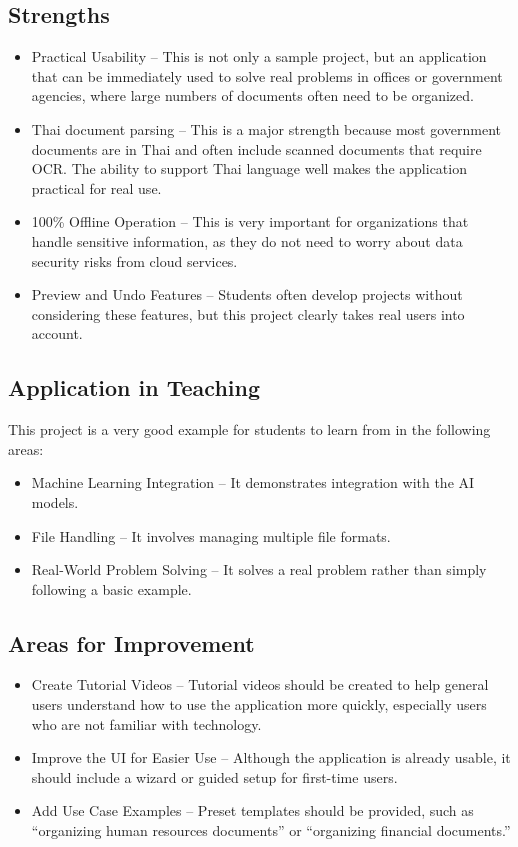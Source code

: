 \documentclass[12pt,oneside,openright,a4paper]{cpe-english-project}
\begin{document}
\subsection*{Strengths}
\begin{itemize}
\item Practical Usability -- This is not only a sample project, but an application that can be immediately used to solve real problems in offices or government agencies, where large numbers of documents often need to be organized.
\item Thai document parsing -- This is a major strength because most government documents are in Thai and often include scanned documents that require OCR. The ability to support Thai language well makes the application practical for real use.
\item 100\% Offline Operation -- This is very important for organizations that handle sensitive information, as they do not need to worry about data security risks from cloud services.
\item Preview and Undo Features -- Students often develop projects without considering these features, but this project clearly takes real users into account.
\end{itemize}
\subsection*{Application in Teaching}
This project is a very good example for students to learn from in the following areas:

\begin{itemize}
\item Machine Learning Integration -- It demonstrates integration with the AI models.
\item File Handling -- It involves managing multiple file formats.
\item Real-World Problem Solving -- It solves a real problem rather than simply following a basic example.
\end{itemize}
\subsection*{Areas for Improvement}
\begin{itemize}
\item Create Tutorial Videos -- Tutorial videos should be created to help general users understand how to use the application more quickly, especially users who are not familiar with technology.
\item Improve the UI for Easier Use -- Although the application is already usable, it should include a wizard or guided setup for first-time users.
\item Add Use Case Examples -- Preset templates should be provided, such as ``organizing human resources documents'' or ``organizing financial documents.''
\end{itemize}
\end{document}

